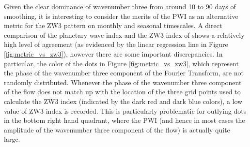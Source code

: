 Given the clear dominance of wavenumber three from around 10 to 90 days of smoothing, it is interesting to consider the merits of the PWI as an alternative metric for the ZW3 pattern on monthly and seasonal timescales. A direct comparison of the planetary wave index and the ZW3 index of \citet{Raphael2004} shows a relatively high level of agreement (as evidenced by the linear regression line in Figure \ref{fig:metric_vs_zw3}), however there are some important discrepancies. In particular, the color of the dots in Figure \ref{fig:metric_vs_zw3}, which represent the phase of the wavenumber three component of the Fourier Transform, are not randomly distributed. Whenever the phase of the wavenumber three component of the flow does not match up with the location of the three grid points used to calculate the ZW3 index (indicated by the dark red and dark blue colors), a low value of ZW3 index is recorded. This is particularly problematic for outlying dots in the bottom right hand quadrant, where the PWI (and hence in most cases the amplitude of the wavenumber three component of the flow) is actually quite large.      

